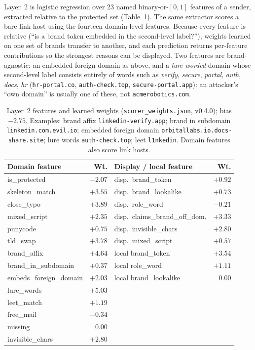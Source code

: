 \documentclass[10pt,twocolumn]{article}
\newcommand{\code}[1]{\texttt{#1}}
\begin{document}
Layer~2 is logistic regression over 23 named binary-or-$[0,1]$ features of a sender, extracted relative to the protected set (Table~\ref{tab:features}). The same extractor scores a bare link host using the fourteen domain-level features. Because every feature is relative (``is a brand token embedded in the second-level label?''), weights learned on one set of brands transfer to another, and each prediction returns per-feature contributions so the strongest reasons can be displayed. Two features are brand-agnostic: an embedded foreign domain as above, and a \emph{lure-worded} domain whose second-level label consists entirely of words such as \emph{verify}, \emph{secure}, \emph{portal}, \emph{auth}, \emph{docs}, \emph{hr} (\code{hr-portal.co}, \code{auth-check.top}, \code{secure-portal.app}): an attacker's ``own domain'' is usually one of these, not \code{acmerobotics.com}.

\begin{table}[t]
\centering\small
\caption{Layer~2 features and learned weights (\code{scorer\_weights.json}, v0.4.0); bias $-2.75$. Examples: brand affix \code{linkedin-verify.app}; brand in subdomain \code{linkedin.com.evil.io}; embedded foreign domain \code{orbitallabs.io.docs-share.site}; lure words \code{auth-check.top}; leet \code{l1nkedin}. Domain features also score link hosts.}
\label{tab:features}
\scriptsize\setlength{\tabcolsep}{2pt}
\begin{tabular}{@{}lr@{\hspace{6pt}}lr@{}}
\toprule
Domain feature & Wt. & Display / local feature & Wt. \\
\midrule
is\_protected & $-2.07$ & disp.\ brand\_token & $+0.92$ \\
skeleton\_match & $+3.55$ & disp.\ brand\_lookalike & $+0.73$ \\
close\_typo & $+3.89$ & disp.\ role\_word & $-0.21$ \\
mixed\_script & $+2.35$ & disp.\ claims\_brand\_off\_dom. & $+3.33$ \\
punycode & $+0.75$ & disp.\ invisible\_chars & $+2.80$ \\
tld\_swap & $+3.78$ & disp.\ mixed\_script & $+0.57$ \\
brand\_affix & $+4.64$ & local brand\_token & $+3.54$ \\
brand\_in\_subdomain & $+0.37$ & local role\_word & $+1.11$ \\
embeds\_foreign\_domain & $+2.03$ & local brand\_lookalike & $0.00$ \\
lure\_words & $+5.03$ & & \\
leet\_match & $+1.19$ & & \\
free\_mail & $-0.34$ & & \\
missing & $0.00$ & & \\
invisible\_chars & $+2.80$ & & \\
\bottomrule
\end{tabular}
\end{table}
\end{document}
